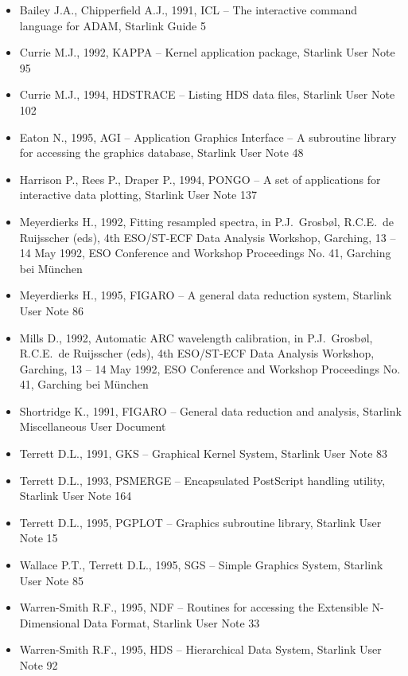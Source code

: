 \begin{itemize}
\item Bailey J.A., Chipperfield A.J., 1991, ICL -- The interactive
   command language for ADAM, Starlink Guide 5
\item Currie M.J., 1992, KAPPA -- Kernel application package, Starlink
   User Note 95
\item Currie M.J., 1994, HDSTRACE -- Listing HDS data files, Starlink
   User Note 102
\item Eaton N., 1995, AGI -- Application Graphics Interface -- A
   subroutine library for accessing the graphics database, Starlink User
   Note 48
\item Harrison P., Rees P., Draper P., 1994, PONGO -- A set of
   applications for interactive data plotting, Starlink User Note 137
\item Meyerdierks H., 1992, Fitting resampled spectra, in
   P.J.\ Grosb\o l, R.C.E.\ de Ruijsscher (eds), 4th ESO/ST-ECF Data
   Analysis Workshop, Garching, 13 -- 14 May 1992, ESO Conference and
   Workshop Proceedings No. 41, Garching bei M\"unchen
\item Meyerdierks H., 1995, FIGARO -- A general data reduction system,
   Starlink User Note 86
\item Mills D., 1992, Automatic ARC wavelength calibration, in
   P.J.\ Grosb\o l, R.C.E.\ de Ruijsscher (eds), 4th ESO/ST-ECF Data
   Analysis Workshop, Garching, 13 -- 14 May 1992, ESO Conference and
   Workshop Proceedings No. 41, Garching bei M\"unchen
\item Shortridge K., 1991, FIGARO -- General data reduction and
   analysis, Starlink Miscellaneous User Document
\item Terrett D.L., 1991, GKS -- Graphical Kernel System, Starlink
   User Note 83
\item Terrett D.L., 1993, PSMERGE -- Encapsulated PostScript
   handling utility, Starlink User Note 164
\item Terrett D.L., 1995, PGPLOT -- Graphics subroutine library,
   Starlink User Note 15
\item Wallace P.T., Terrett D.L., 1995, SGS -- Simple Graphics System,
   Starlink User Note 85
\item Warren-Smith R.F., 1995, NDF -- Routines for accessing the
   Extensible N-Dimensional Data Format, Starlink User Note 33
\item Warren-Smith R.F., 1995, HDS -- Hierarchical Data System, Starlink
   User Note 92
\end{itemize}

